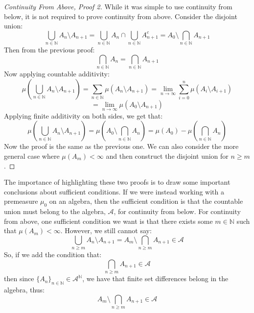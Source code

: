 \documentclass[10pt,letterpaper]{article} %
\begin{document}
\begin{proof}[Continuity From Above, Proof 2]
While it was simple to use continuity from below, it is not required to prove continuity from above. Consider the disjoint union:
\begin{equation*}
\bigcup_{n \in \mathbb{N}}A_{n}\setminus A_{n+1} = \bigcup_{n \in \mathbb{N}}A_n \cap \bigcup_{n \in \mathbb{N}}A_{n+1}^c = A_0 \setminus \bigcap_{n \in \mathbb{N}}A_{n+1}
\end{equation*}
Then from the previous proof:
\begin{equation*}
\bigcap_{n \in \mathbb{N}}A_n = \bigcap_{n \in \mathbb{N}}A_{n+1}
\end{equation*}
Now applying countable additivity:
\begin{equation*}
\mu\left(\bigcup_{n \in \mathbb{N}}A_n \setminus A_{n+1}\right) = \sum_{n \in \mathbb{N}}\mu(A_n \setminus A_{n+1}) = \lim_{n \xrightarrow{} \infty}\sum_{i=0}^n\mu(A_i \setminus A_{i+1})
\end{equation*} 
\begin{equation*}
= \lim_{n \xrightarrow{} \infty}\mu(A_0 \setminus A_{n+1})
\end{equation*}
Applying finite additivity on both sides, we get that:
\begin{equation*}
\mu\left(\bigcup_{n \in \mathbb{N}}A_n \setminus A_{n+1}\right) = \mu\left(A_0 \setminus \bigcap_{n \in \mathbb{N}}A_n\right) = \mu(A_0) - \mu\left(\bigcap_{n \in \mathbb{N}}A_n\right)
\end{equation*}
Now the proof is the same as the previous one. We can also consider the more general case where $\mu(A_m) < \infty$ and then construct the disjoint union for $n \geqslant m$.
\end{proof}

The importance of highlighting these two proofs is to draw some important conclusions about sufficient conditions. If we were instead working with a premeasure $\mu_0$ on an algebra, then the sufficient condition is that the countable union must belong to the algebra, $\mathcal{A}$, for continuity from below.
For continuity from above, one sufficient condition we want is that there exists some $m \in \mathbb{N}$ such that $\mu(A_m) < \infty$. However, we still cannot say:
\begin{equation*}
\bigcup_{n \geqslant m}A_n \setminus A_{n+1} = A_m \setminus \bigcap_{n \geqslant m} A_{n+1} \in \mathcal{A}
\end{equation*}
So, if we add the condition that:
\begin{equation*}
\bigcap_{n \geqslant m}A_{n+1} \in \mathcal{A}
\end{equation*}
then since $\{A_n\}_{n \in \mathbb{N}} \in \mathcal{A}^\mathbb{N}$, we have that finite set differences belong in the algebra, thus:
\begin{equation*}
A_m \setminus \bigcap_{n \geqslant m}A_{n+1} \in \mathcal{A}
\end{equation*}
\end{document}
